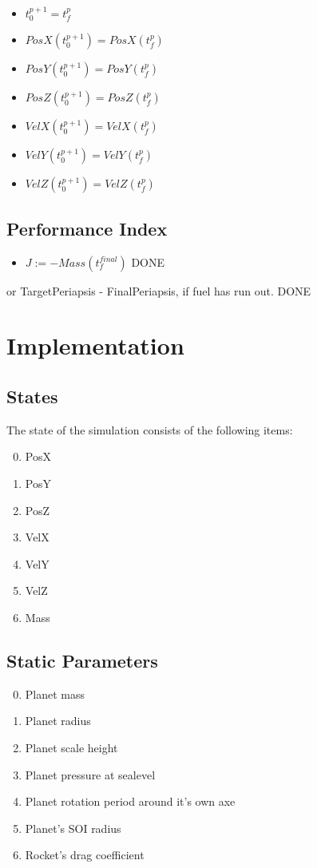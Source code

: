 \documentclass[11pt]{report}
\newcommand{\DONE}{{DONE}}
\begin{document}
\begin{itemize}
\item $t_0^{p+1} = t_f^p$
\item $PosX(t_0^{p+1}) = PosX(t_f^p)$
\item $PosY(t_0^{p+1}) = PosY(t_f^p)$
\item $PosZ(t_0^{p+1}) = PosZ(t_f^p)$
\item $VelX(t_0^{p+1}) = VelX(t_f^p)$
\item $VelY(t_0^{p+1}) = VelY(t_f^p)$
\item $VelZ(t_0^{p+1}) = VelZ(t_f^p)$
\end{itemize}

\section{Performance Index}

\begin{itemize}
\item $J := - Mass(t_f^{final})$ \DONE
\end{itemize}
or TargetPeriapsis - FinalPeriapsis, if fuel has run out. \DONE

\chapter{Implementation}

\section{States}

The state of the simulation consists of the following items:

\begin{enumerate}
\setcounter{enumi}{-1}
\item PosX
\item PosY
\item PosZ
\item VelX
\item VelY
\item VelZ
\item Mass
\end{enumerate}

\section{Static Parameters}

\begin{enumerate}
\setcounter{enumi}{-1}
\item Planet mass
\item Planet radius
\item Planet scale height
\item Planet pressure at sealevel
\item Planet rotation period around it's own axe
\item Planet's SOI radius
\item Rocket's drag coefficient
\end{enumerate}
\end{document}
